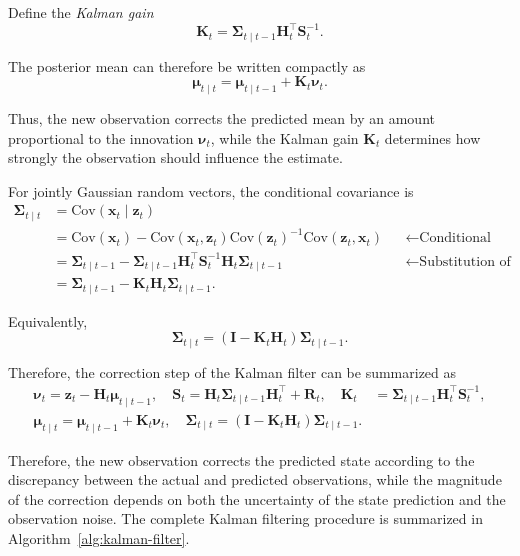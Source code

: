 \documentclass[../Bayesian_Inference.tex]{subfiles}
\begin{document}
Define the \emph{Kalman gain}
\[
    \mathbf{K}_t = \mathbf{\Sigma}_{t\mid t-1}\mathbf{H}_t^\top\mathbf{S}_t^{-1}.
\]

The posterior mean can therefore be written compactly as
\[
    \bm{\mu}_{t\mid t} = \bm{\mu}_{t\mid t-1} + \mathbf{K}_t\bm{\nu}_t.
\]

Thus, the new observation corrects the predicted mean by an amount proportional to the innovation $\bm{\nu}_t$, while the Kalman gain $\mathbf{K}_t$ determines how strongly the observation should influence the estimate.

For jointly Gaussian random vectors, the conditional covariance is
\[
\begin{aligned}
    \mathbf{\Sigma}_{t\mid t} &= \mathrm{Cov}(\bm{x}_t\mid\bm{z}_t) \\
    &= \mathrm{Cov}(\bm{x}_t)- \mathrm{Cov}(\bm{x}_t,\bm{z}_t)\mathrm{Cov}(\bm{z}_t)^{-1}\mathrm{Cov}(\bm{z}_t,\bm{x}_t)&&\leftarrow \text{Conditional Gaussian formula} \\
    &= \mathbf{\Sigma}_{t\mid t-1}- \mathbf{\Sigma}_{t\mid t-1}\mathbf{H}_t^\top\mathbf{S}_t^{-1}\mathbf{H}_t\mathbf{\Sigma}_{t\mid t-1}&&\leftarrow \text{Substitution of covariance terms} \\
    &= \mathbf{\Sigma}_{t\mid t-1}- \mathbf{K}_t\mathbf{H}_t\mathbf{\Sigma}_{t\mid t-1}.
\end{aligned}
\]

Equivalently,
\[
    \mathbf{\Sigma}_{t\mid t} = \left(\mathbf{I}-\mathbf{K}_t\mathbf{H}_t\right)
    \mathbf{\Sigma}_{t\mid t-1}.
\]

Therefore, the correction step of the Kalman filter can be summarized as
\[
\begin{aligned}
    \bm{\nu}_t = \bm{z}_t-\mathbf{H}_t\bm{\mu}_{t\mid t-1}, \quad \mathbf{S}_t = \mathbf{H}_t\mathbf{\Sigma}_{t\mid t-1}\mathbf{H}_t^\top+\mathbf{R}_t, \quad  \mathbf{K}_t&= \mathbf{\Sigma}_{t\mid t-1}\mathbf{H}_t^\top\mathbf{S}_t^{-1}, \\ 
    \bm{\mu}_{t\mid t} = \bm{\mu}_{t\mid t-1}+\mathbf{K}_t\bm{\nu}_t, \quad \mathbf{\Sigma}_{t\mid t} = \left(\mathbf{I}-\mathbf{K}_t\mathbf{H}_t\right)
    \mathbf{\Sigma}_{t\mid t-1}.
\end{aligned}
\]

Therefore, the new observation corrects the predicted state according to the discrepancy between the actual and predicted observations, while the magnitude of the correction depends on both the uncertainty of the state prediction and the observation noise. The complete Kalman filtering procedure is summarized in Algorithm~\ref{alg:kalman-filter}.
\end{document}

